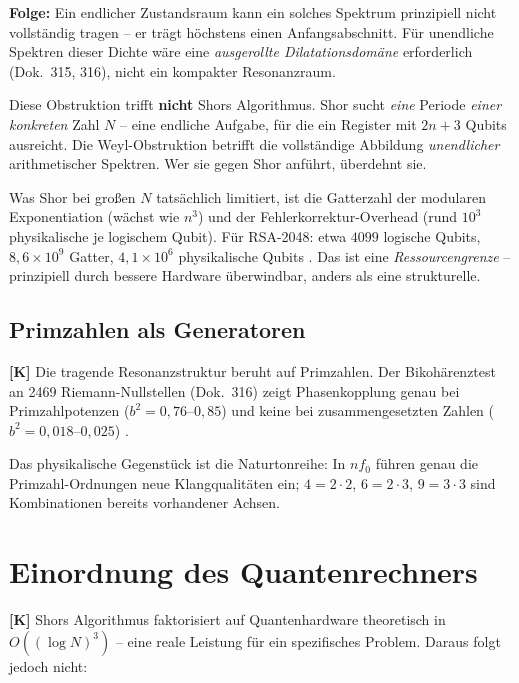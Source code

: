 \textbf{Folge:} Ein endlicher Zustandsraum kann ein solches Spektrum
prinzipiell nicht vollständig tragen -- er trägt höchstens einen
Anfangsabschnitt. Für unendliche Spektren dieser Dichte wäre eine
\emph{ausgerollte Dilatationsdomäne} erforderlich (Dok.~315, 316), nicht ein
kompakter Resonanzraum.

\begin{keyresult}
Diese Obstruktion trifft \textbf{nicht} Shors Algorithmus. Shor sucht
\emph{eine} Periode \emph{einer konkreten} Zahl $N$ -- eine endliche Aufgabe,
für die ein Register mit $2n+3$ Qubits ausreicht. Die Weyl-Obstruktion
betrifft die vollständige Abbildung \emph{unendlicher} arithmetischer
Spektren. Wer sie gegen Shor anführt, überdehnt sie.

Was Shor bei großen $N$ tatsächlich limitiert, ist die Gatterzahl der
modularen Exponentiation (wächst wie $n^3$) und der
Fehlerkorrektur-Overhead (rund $10^3$ physikalische je logischem Qubit).
Für RSA-2048: etwa $4099$ logische Qubits, $8{,}6\times10^9$ Gatter,
$4{,}1\times10^6$ physikalische Qubits \cite{Gidney2021}. Das ist eine
\emph{Ressourcengrenze} -- prinzipiell durch bessere Hardware überwindbar,
anders als eine strukturelle.
\end{keyresult}

\subsection{Primzahlen als Generatoren}

\textbf{[K]} Die tragende Resonanzstruktur beruht auf Primzahlen. Der
Bikohärenztest an 2469 Riemann-Nullstellen (Dok.~316) zeigt Phasenkopplung
genau bei Primzahlpotenzen ($b^2 = 0{,}76$--$0{,}85$) und keine bei
zusammengesetzten Zahlen ($b^2 = 0{,}018$--$0{,}025$) \cite{Dok316}.

Das physikalische Gegenstück ist die Naturtonreihe: In $n f_0$ führen genau
die Primzahl-Ordnungen neue Klangqualitäten ein; $4 = 2\cdot2$, $6 = 2\cdot3$,
$9 = 3\cdot3$ sind Kombinationen bereits vorhandener Achsen.

\section{Einordnung des Quantenrechners}

\textbf{[K]} Shors Algorithmus faktorisiert auf Quantenhardware theoretisch in
$O((\log N)^3)$ \cite{Nielsen2010} -- eine reale Leistung für ein spezifisches
Problem. Daraus folgt jedoch nicht:

